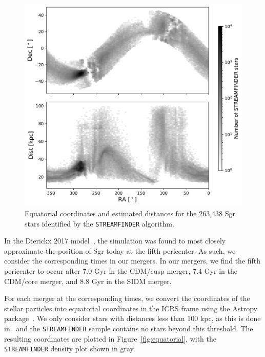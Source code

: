 \begin{figure}
    \centering 
    \includegraphics[width=0.7\linewidth]{figs/streamfinder.pdf}
    \caption{%
        Equatorial coordinates and estimated distances for the 263,438 Sgr
        stars identified by the \texttt{STREAMFINDER} algorithm.
    }
    \label{fig:streamfinder}
\end{figure}

In the Dierickx 2017 model~\cite{dierickx_predicted_2017}, the simulation was
found to most closely approximate the position of Sgr today at the fifth
pericenter.  As such, we consider the corresponding times in our mergers.  In
our mergers, we find the fifth pericenter to occur after 7.0 Gyr in the
CDM/cusp merger, 7.4 Gyr in the CDM/core merger, and 8.8 Gyr in the SIDM
merger.

For each merger at the corresponding times, we convert the coordinates of the
stellar particles into equatorial coordinates in the ICRS frame using the
Astropy
package~\cite{astropy_collaboration_astropy_2013,astropy_collaboration_astropy_2018}.
We only consider stars with distances less than 100 kpc, as this is done
in~\cite{dierickx_predicted_2017} and the \verb|STREAMFINDER| sample contains no
stars beyond this threshold.  The resulting coordinates are plotted in
Figure~\ref{fig:equatorial}, with the \verb|STREAMFINDER| density plot shown
in gray.

